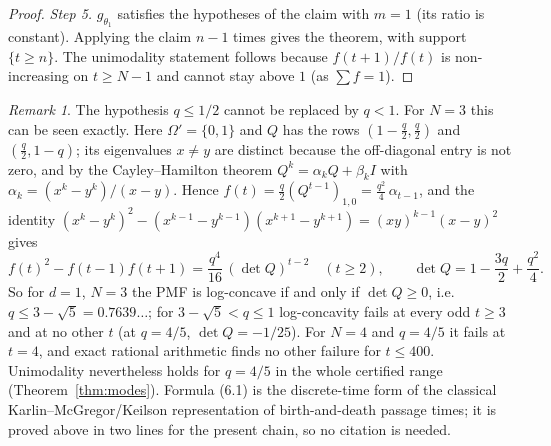 \documentclass[11pt,a4paper]{article}
\theoremstyle{definition}
\theoremstyle{remark}
\newtheorem{remark}[theorem]{Remark}
\begin{document}
\begin{proof}
\emph{Step 5.} $g_{\theta_1}$ satisfies the hypotheses of the claim with $m=1$ (its ratio is constant). Applying the claim $n-1$ times gives the theorem, with support $\{t\ge n\}$. The unimodality statement follows because $f(t+1)/f(t)$ is non-increasing on $t\ge N-1$ and cannot stay above $1$ (as $\sum f=1$).
\end{proof}

\begin{remark}\label{rem:lc}
The hypothesis $q\le1/2$ cannot be replaced by $q<1$. For $N=3$ this can be seen exactly. Here $\Omega'=\{0,1\}$ and $Q$ has the rows $(1-\frac q2,\frac q2)$ and $(\frac q2,1-q)$; its eigenvalues $x\ne y$ are distinct because the off-diagonal entry is not zero, and by the Cayley--Hamilton theorem $Q^k=\alpha_kQ+\beta_kI$ with $\alpha_k=(x^k-y^k)/(x-y)$. Hence $f(t)=\frac q2(Q^{t-1})_{1,0}=\frac{q^2}4\,\alpha_{t-1}$, and the identity $(x^k-y^k)^2-(x^{k-1}-y^{k-1})(x^{k+1}-y^{k+1})=(xy)^{k-1}(x-y)^2$ gives
\[
f(t)^2-f(t-1)f(t+1)=\frac{q^4}{16}\,(\det Q)^{t-2}\quad(t\ge2),\qquad \det Q=1-\frac{3q}2+\frac{q^2}4 .
\]
So for $d=1$, $N=3$ the PMF is log-concave if and only if $\det Q\ge0$, i.e.\ $q\le3-\sqrt5=0.7639\ldots$; for $3-\sqrt5<q\le1$ log-concavity fails at every odd $t\ge3$ and at no other $t$ (at $q=4/5$, $\det Q=-1/25$). For $N=4$ and $q=4/5$ it fails at $t=4$, and exact rational arithmetic finds no other failure for $t\le400$. Unimodality nevertheless holds for $q=4/5$ in the whole certified range (Theorem~\ref{thm:modes}).
Formula (6.1) is the discrete-time form of the classical Karlin--McGregor/Keilson representation of birth-and-death passage times; it is proved above in two lines for the present chain, so no citation is needed.
\end{remark}
\end{document}
